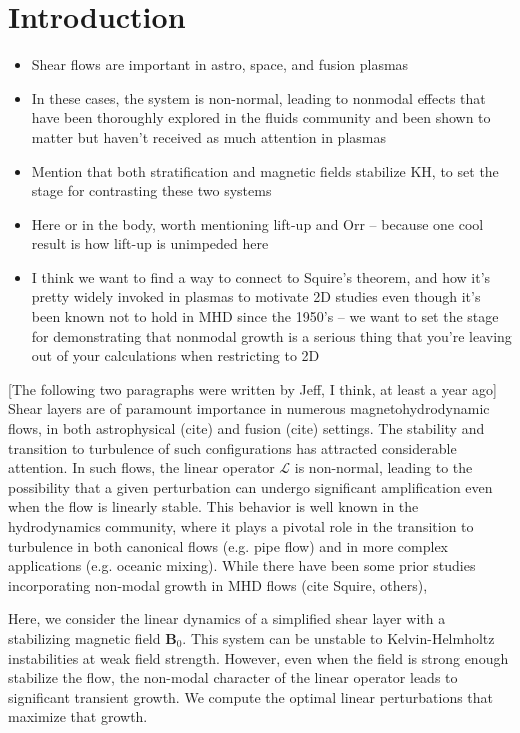 \documentclass[%
 reprint,
 amsmath,amssymb,
 aps,
]{revtex4-2}
\newcommand{\Bzero}{\mathbf{B}_0}
\newcommand{\linop}{\mathcal{L}}
\begin{document}
\section{Introduction}
    \begin{itemize}
        \item Shear flows are important in astro, space, and fusion plasmas
        \item In these cases, the system is non-normal, leading to nonmodal effects that have been thoroughly explored in the fluids community and been shown to matter but haven't received as much attention in plasmas
        \item Mention that both stratification and magnetic fields stabilize KH, to set the stage for contrasting these two systems
        \item Here or in the body, worth mentioning lift-up and Orr -- because one cool result is how lift-up is unimpeded here
        \item I think we want to find a way to connect to Squire's theorem, and how it's pretty widely invoked in plasmas to motivate 2D studies even though it's been known not to hold in MHD since the 1950's -- we want to set the stage for demonstrating that nonmodal growth is a serious thing that you're leaving out of your calculations when restricting to 2D
    \end{itemize}
[The following two paragraphs were written by Jeff, I think, at least a year ago] Shear layers are of paramount importance in numerous magnetohydrodynamic flows, in both astrophysical (cite) and fusion (cite) settings. The stability and transition to turbulence of such configurations has attracted considerable attention. In such flows, the linear operator $\linop$ is non-normal, leading to the possibility that a given perturbation can undergo significant amplification even when the flow is linearly stable. This behavior is well known in the hydrodynamics community, where it plays a pivotal role in the transition to turbulence in both canonical flows (e.g. pipe flow) and in more complex applications (e.g. oceanic mixing). While there  have been some prior studies incorporating non-modal growth in MHD flows (cite Squire, others), 

Here, we consider the linear dynamics of a simplified shear layer with a stabilizing magnetic field $\Bzero$. This system can be unstable to Kelvin-Helmholtz instabilities at weak field strength. However, even when the field is strong enough stabilize the flow, the non-modal character of the linear operator leads to significant transient growth. We compute the optimal linear perturbations that maximize that growth.
\end{document}
